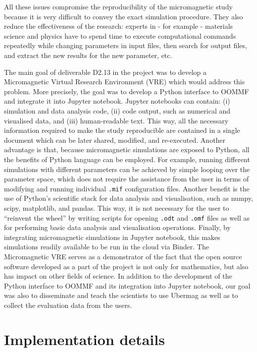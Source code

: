 \documentclass{deliverablereport}
\begin{document}
All these issues compromise the reproducibility of the micromagnetic
study because it is very difficult to convey the exact simulation
procedure. They also reduce the effectiveness of the research: experts
in - for example - materials science and physics have to spend time to
execute computational commands repeatedly while changing parameters in
input files, then search for output files, and extract the new results
for the new parameter, etc.

The main goal of deliverable D2.13 in the \ODK project was
to develop a Micromagnetic Virtual Research Environment (VRE) which
would address this problem. More precisely, the goal was to develop a
Python interface to OOMMF and integrate it into Jupyter
notebook. Jupyter notebooks can contain: (i) simulation and data
analysis code, (ii) code output, such as numerical and visualised
data, and (iii) human-readable text. This way, all the necessary
information required to make the study reproducible are contained in a
single document which can be later shared, modified, and
re-executed. Another advantage is that, because micromagnetic
simulations are exposed to Python, all the benefits of Python language
can be employed. For example, running different simulations with
different parameters can be achieved by simple looping over the
parameter space, which does not require the assistance from the user
in terms of modifying and running individual \texttt{.mif}
configuration files. Another benefit is the use of Python's scientific
stack for data analysis and visualisation, such as numpy, scipy,
matplotlib, and pandas. This way, it is not
necessary for the user to ``reinvent the wheel'' by writing scripts
for opening \texttt{.odt} and \texttt{.omf} files as well as for
performing basic data analysis and visualisation operations. Finally,
by integrating micromagnetic simulations in Jupyter notebook, this
makes simulations readily available to be run in the cloud via
Binder. The Micromagnetic VRE serves as a demonstrator of the fact
that the open source software developed as a part of the \ODK project
is not only for mathematics, but also has impact on other fields of
science. In addition to the development of the Python interface to
OOMMF and its integration into Jupyter notebook, our goal was also to
disseminate and teach the scientists to use Ubermag as well as to
collect the evaluation data from the users.

\section{Implementation details}
\end{document}
